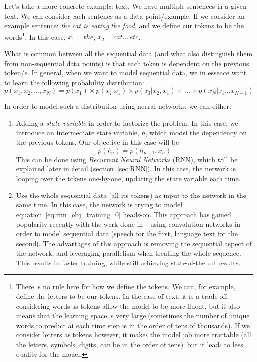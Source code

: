 \par Let's take a more concrete example: text. We have multiple sentences in a given text. We can consider each sentence as a data point/example. If we consider an example sentence: \textit{the cat is eating the food}, and we define our tokens to be the words\footnote{There is no rule here for how we define the tokens. We can, for example, define the letters to be our tokens. In the case of text, it is a trade-off: considering words as tokens allow the model to be more fluent, but it also means that the learning space is very large (sometimes the number of unique words to predict at each time step is in the order of tens of thousands). If we consider letters as tokens however, it makes the model job more tractable (all the letters, symbols, digits, can be in the order of tens), but it leads to less quality for the model.}. In this case, $x_1=the$, $x_2=cat\dots\,etc$.

\par What is common between all the sequential data (and what also distinguish them from non-sequential data points) is that each token is dependent on the previous token/s. In general, when we want to model sequential data, we in essence want to learn the following probability distribution:
\begin{equation}
    p(x_1, x_2, ..., x_N) = p(x_1) \times p(x_2|x_1) \times p(x_3|x_2, x_1) \times .... \times p(x_N|x_1 ... x_{N-1})
    \label{eq:rnn_obj_training_0}
\end{equation}

\par In order to model such a distribution using neural networks, we can either:
\begin{enumerate}
    \item Adding a \textit{state variable} in order to factorize the problem. In this case, we introduce an intermediate state variable, $h$, which model the dependency on the previous tokens. Our objective in this case will be
    \begin{equation}
        p(h_n) = p(h_{n-1}, x_{n})
        \label{eq:rnn_factorization}
    \end{equation}
    This can be done using \textit{Recurrent Neural Networks} (RNN), which will be explained later in detail (section~\ref{sec:RNN}). In this case, the network is looping over the tokens one-by-one, updating the state variable each time.
    \item Use the whole sequential data (all its tokens) as input to the network in the same time. In this case, the network is trying to model equation~\ref{eq:rnn_obj_training_0} heads-on. This approach has gained popularity recently with the work done in~\citep{oord2016wavenet,gehring2017convolutional}, using convolution networks in order to model sequential data (speech for the first, language text for the second). The advantages of this approach is removing the sequential aspect of the network, and leveraging parallelism when treating the whole sequence. This results in faster training, while still achieving state-of-the art results.
\end{enumerate}

